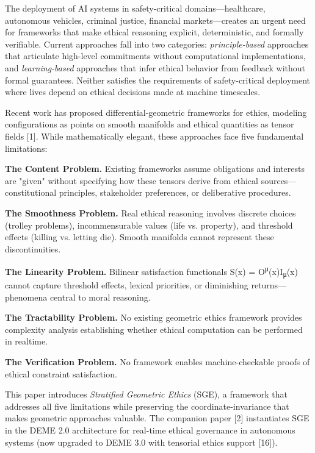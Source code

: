 \documentclass[12pt]{article}
\theoremstyle{plain}
\theoremstyle{definition}
\theoremstyle{remark}
\begin{document}
The deployment of AI systems in safety-critical domains---healthcare,
autonomous vehicles, criminal justice, financial markets---creates an
urgent need for frameworks that make ethical reasoning explicit,
deterministic, and formally verifiable. Current approaches fall into two
categories: \emph{principle-based} approaches that articulate high-level
commitments without computational implementations, and
\emph{learning-based} approaches that infer ethical behavior from
feedback without formal guarantees. Neither satisfies the requirements
of safety-critical deployment where lives depend on ethical decisions
made at machine timescales.

Recent work has proposed differential-geometric frameworks for ethics,
modeling configurations as points on smooth manifolds and ethical
quantities as tensor fields {[}1{]}. While mathematically elegant, these
approaches face five fundamental limitations:

\textbf{The Content Problem.} Existing frameworks assume obligations and
interests are "given" without specifying how these tensors derive from
ethical sources---constitutional principles, stakeholder preferences, or
deliberative procedures.

\textbf{The Smoothness Problem.} Real ethical reasoning involves
discrete choices (trolley problems), incommensurable values (life vs.
property), and threshold effects (killing vs. letting die). Smooth
manifolds cannot represent these discontinuities.

\textbf{The Linearity Problem.} Bilinear satisfaction functionals S(x) =
O\textsuperscript{μ}(x)I\textsubscript{μ}(x) cannot capture threshold
effects, lexical priorities, or diminishing returns---phenomena central
to moral reasoning.

\textbf{The Tractability Problem.} No existing geometric ethics
framework provides complexity analysis establishing whether ethical
computation can be performed in realtime.

\textbf{The Verification Problem.} No framework enables
machine-checkable proofs of ethical constraint satisfaction.

This paper introduces \emph{Stratified Geometric Ethics} (SGE), a
framework that addresses all five limitations while preserving the
coordinate-invariance that makes geometric approaches valuable. The
companion paper {[}2{]} instantiates SGE in the DEME 2.0 architecture
for real-time ethical governance in autonomous systems (now upgraded to DEME 3.0 with tensorial ethics support {[}16{]}).
\end{document}
